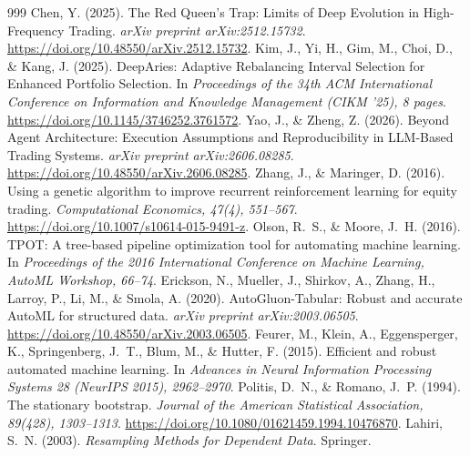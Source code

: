 \documentclass[analytics,article,submit,pdftex,moreauthors]{Definitions/mdpi}
\begin{document}
\begin{thebibliography}{999}
 Chen, Y. (2025). The Red Queen's Trap: Limits of Deep Evolution in High-Frequency Trading. \emph{arXiv preprint arXiv:2512.15732}. \url{https://doi.org/10.48550/arXiv.2512.15732}.
 Kim, J., Yi, H., Gim, M., Choi, D., \& Kang, J. (2025). DeepAries: Adaptive Rebalancing Interval Selection for Enhanced Portfolio Selection. In \emph{Proceedings of the 34th ACM International Conference on Information and Knowledge Management (CIKM '25), 8 pages}. \url{https://doi.org/10.1145/3746252.3761572}.
 Yao, J., \& Zheng, Z. (2026). Beyond Agent Architecture: Execution Assumptions and Reproducibility in LLM-Based Trading Systems. \emph{arXiv preprint arXiv:2606.08285}. \url{https://doi.org/10.48550/arXiv.2606.08285}.
 Zhang, J., \& Maringer, D. (2016). Using a genetic algorithm to improve recurrent reinforcement learning for equity trading. \emph{Computational Economics, 47(4), 551--567}. \url{https://doi.org/10.1007/s10614-015-9491-z}.
 Olson, R.~S., \& Moore, J.~H. (2016). {TPOT}: A tree-based pipeline optimization tool for automating machine learning. In \emph{Proceedings of the 2016 International Conference on Machine Learning, AutoML Workshop, 66--74}.
 Erickson, N., Mueller, J., Shirkov, A., Zhang, H., Larroy, P., Li, M., \& Smola, A. (2020). {AutoGluon-Tabular}: Robust and accurate {AutoML} for structured data. \emph{arXiv preprint arXiv:2003.06505}. \url{https://doi.org/10.48550/arXiv.2003.06505}.
 Feurer, M., Klein, A., Eggensperger, K., Springenberg, J.~T., Blum, M., \& Hutter, F. (2015). Efficient and robust automated machine learning. In \emph{Advances in Neural Information Processing Systems 28 (NeurIPS 2015), 2962--2970}.
 Politis, D.~N., \& Romano, J.~P. (1994). The stationary bootstrap. \emph{Journal of the American Statistical Association, 89(428), 1303--1313}. \url{https://doi.org/10.1080/01621459.1994.10476870}.
 Lahiri, S.~N. (2003). \emph{Resampling Methods for Dependent Data}. Springer.
\end{thebibliography}
\end{document}
